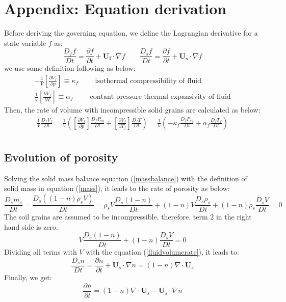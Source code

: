\documentclass[preprint,12pt]{elsarticle}
\begin{document}

\section{\textsf{Appendix: Equation derivation}}
%
%
Before deriving the governing equation, we define the Lagrangian derivative for a state variable $f$ as:
%
%
\begin{equation}
\frac{D_f f}{Dt} =  \frac{\partial f}{\partial t} + \pmb{U_f} \cdot \nabla f \qquad
\frac{D_s f}{Dt} =  \frac{\partial f}{\partial t} + \pmb{U_s} \cdot \nabla f
\end {equation}
%
%
we use some definition following \cite{Kashiwa} as below:
%
%
\begin{gather}
-\frac{1}{V} \left[ \frac{\partial V_f}{\partial p} \right] \equiv \kappa_f \qquad \mbox{ isothermal compressibility of fluid} \\
\frac{1}{V} \left[ \frac{\partial V_f}{\partial T} \right] \equiv \alpha_f \qquad \mbox{ contant pressure thermal expansivity of fluid}
\end {gather}
%
%
Then, the rate of volume with incompressible solid grains are calculated as below:
%
%
\begin{equation}
\label{fluidvolumerate}
\begin{gathered}
   \frac{1}{V} \frac{D_f V_f}{Dt} = \frac{1}{V} \left( \left[ \frac{\partial V_f}{\partial p} \right] \frac{D_f P_{eq}}{D t} + \left[ \frac{\partial V_f}{\partial T_f} \right] \frac{D_f T}{D t} \right) = \frac{1}{V} \left( -\kappa_f \frac{D_f P_{eq}}{D t} + \alpha_f \frac{D_f T_f}{D t} \right) \\
\end {gathered}
\end {equation}
%
%
\subsection{\textsf{Evolution of porosity}}
%
%
Solving the solid mass balance equation (\ref{massbalance}) with the definition of solid mass in equation (\ref{mass}), it leads to the rate of porosity as below:
%
%
\begin{equation}
   \frac{D_sm_s}{Dt} = \frac{D_s((1-n) \rho_s V)}{Dt} = \rho_s V \frac{D_s(1-n)}{Dt} + (1-n) V \frac{D_s \rho_s}{Dt} + (1-n) \rho_s  \frac{D_s V}{Dt} = 0  
\end {equation}
%
%
The soil grains are assumed to be incompressible, therefore, term 2 in the right hand side is zero. 
%
%
\begin{equation}
  V \frac{D_s(1-n)}{Dt} + (1-n) \frac{D_s V}{Dt} = 0  
\end {equation}
%
%
Dividing all terms with $V$ with the equation (\ref{fluidvolumerate}), it leads to:
%
%
\begin{equation}
  \frac{D_s n}{Dt} = \frac{\partial n}{\partial t} + \pmb{U}_s \cdot \nabla n = 
  (1-n) \nabla \cdot \pmb{U}_s  
\end {equation}
%
%
Finally, we get:
%
%
\begin{equation}
\label{p1}
\frac{\partial n}{\partial t} = (1-n) \nabla \cdot \pmb{U}_s  - \pmb{U}_s \cdot \nabla n
\end {equation}
%
%
\end{document}
